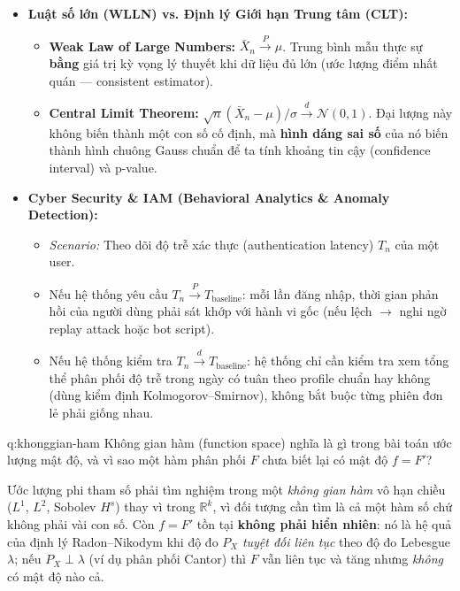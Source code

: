 \begin{itemize}
\item \textbf{Luật số lớn (WLLN) vs. Định lý Giới hạn Trung tâm (CLT):}
  \begin{itemize}
  \item \textbf{Weak Law of Large Numbers:} $\bar X_n\xrightarrow{P}\mu$. Trung bình mẫu thực sự \textbf{bằng} giá trị kỳ vọng lý thuyết khi dữ liệu đủ lớn (ước lượng điểm nhất quán --- consistent estimator).
  \item \textbf{Central Limit Theorem:} $\sqrt{n}(\bar X_n-\mu)/\sigma\xrightarrow{d}\mathcal{N}(0,1)$. Đại lượng này không biến thành một con số cố định, mà \textbf{hình dáng sai số} của nó biến thành hình chuông Gauss chuẩn để ta tính khoảng tin cậy (confidence interval) và p-value.
  \end{itemize}
\item \textbf{Cyber Security \& IAM (Behavioral Analytics \& Anomaly Detection):}
  \begin{itemize}
  \item \emph{Scenario:} Theo dõi độ trễ xác thực (authentication latency) $T_n$ của một user.
  \item Nếu hệ thống yêu cầu $T_n\xrightarrow{P}T_{\text{baseline}}$: mỗi lần đăng nhập, thời gian phản hồi của người dùng phải sát khớp với hành vi gốc (nếu lệch $\to$ nghi ngờ replay attack hoặc bot script).
  \item Nếu hệ thống kiểm tra $T_n\xrightarrow{d}T_{\text{baseline}}$: hệ thống chỉ cần kiểm tra xem tổng thể phân phối độ trễ trong ngày có tuân theo profile chuẩn hay không (dùng kiểm định Kolmogorov--Smirnov), không bắt buộc từng phiên đơn lẻ phải giống nhau.
  \end{itemize}
\end{itemize}


\begin{cauhoi}[Không gian hàm là gì, và vì sao $F$ chưa biết lại có mật độ $f=F'$?]{q:khonggian-ham}
Không gian hàm (function space) nghĩa là gì trong bài toán ước lượng mật độ, và vì sao một hàm phân phối $F$ chưa biết lại có mật độ $f=F'$?
\end{cauhoi}

\begin{chot}
Ước lượng phi tham số phải tìm nghiệm trong một \emph{không gian hàm} vô hạn chiều ($L^1$, $L^2$, Sobolev $H^s$) thay vì trong $\mathbb{R}^k$, vì đối tượng cần tìm là cả một hàm số chứ không phải vài con số. Còn $f=F'$ tồn tại \textbf{không phải hiển nhiên}: nó là hệ quả của định lý Radon--Nikodym khi độ đo $P_X$ \emph{tuyệt đối liên tục} theo độ đo Lebesgue $\lambda$; nếu $P_X\perp\lambda$ (ví dụ phân phối Cantor) thì $F$ vẫn liên tục và tăng nhưng \emph{không} có mật độ nào cả.
\end{chot}

